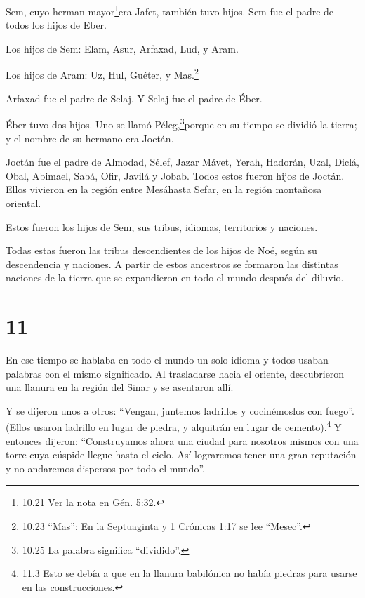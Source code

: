  Sem, cuyo herman mayor\footnote{10.21 Ver la nota en Gén.
  5:32.}era Jafet, también tuvo hijos. Sem fue el padre de todos los
hijos de Eber.

 Los hijos de Sem: Elam, Asur, Arfaxad, Lud, y Aram.

 Los hijos de Aram: Uz, Hul, Guéter, y Mas.\footnote{10.23
  ``Mas'': En la Septuaginta y 1 Crónicas 1:17 se lee ``Mesec''.}

 Arfaxad fue el padre de Selaj. Y Selaj fue el padre de
Éber.

 Éber tuvo dos hijos. Uno se llamó Péleg,\footnote{10.25 La
  palabra significa ``dividido''.}porque en su tiempo se dividió la
tierra; y el nombre de su hermano era Joctán.

 Joctán fue el padre de Almodad, Sélef, Jazar Mávet, Yerah,
 Hadorán, Uzal, Diclá,  Obal, Abimael, Sabá,
 Ofir, Javilá y Jobab. Todos estos fueron hijos de Joctán.
 Ellos vivieron en la región entre Mesáhasta Sefar, en la
región montañosa oriental.

 Estos fueron los hijos de Sem, sus tribus, idiomas,
territorios y naciones.

 Todas estas fueron las tribus descendientes de los hijos
de Noé, según su descendencia y naciones. A partir de estos ancestros se
formaron las distintas naciones de la tierra que se expandieron en todo
el mundo después del diluvio.

\hypertarget{section-10}{%
\section{11}\label{section-10}}

 En ese tiempo se hablaba en todo el mundo un solo idioma y
todos usaban palabras con el mismo significado.  Al
trasladarse hacia el oriente, descubrieron una llanura en la región del
Sinar y se asentaron allí.

 Y se dijeron unos a otros: ``Vengan, juntemos ladrillos y
cocinémoslos con fuego''. (Ellos usaron ladrillo en lugar de piedra, y
alquitrán en lugar de cemento).\footnote{11.3 Esto se debía a que en la
  llanura babilónica no había piedras para usarse en las construcciones.}
 Y entonces dijeron: ``Construyamos ahora una ciudad para
nosotros mismos con una torre cuya cúspide llegue hasta el cielo. Así
lograremos tener una gran reputación y no andaremos dispersos por todo
el mundo''.

